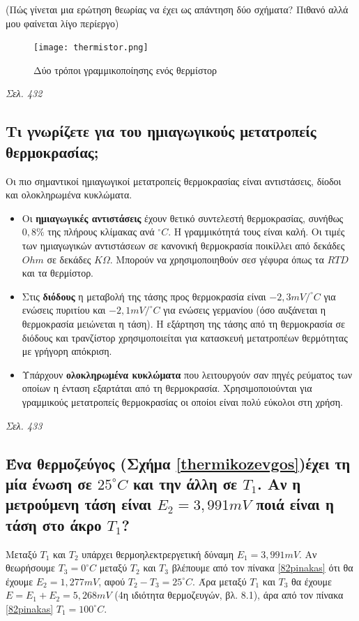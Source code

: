 \documentclass{article}
\begin{document}
(Πώς γίνεται μια ερώτηση θεωρίας να έχει ως απάντηση δύο σχήματα? Πιθανό αλλά μου φαίνεται λίγο περίεργο)

\begin{figure}[h!]
    \texttt{[image: thermistor.png]}
    \caption{Δύο τρόποι γραμμικοποίησης ενός θερμίστορ}
    \label{thermistor}
\end{figure}

\emph{Σελ. 432}

\subsection{Τι γνωρίζετε για του ημιαγωγικούς μετατροπείς θερμοκρασίας;}
Οι πιο σημαντικοί ημιαγωγικοί μετατροπείς θερμοκρασίας είναι αντιστάσεις, δίοδοι και ολοκληρωμένα κυκλώματα.

\begin{itemize}
    \item Οι \textbf{ημιαγωγικές αντιστάσεις} έχουν θετικό συντελεστή θερμοκρασίας, συνήθως $0,8\%$ της πλήρους κλίμακας ανά $^{\circ}C$. Η γραμμικότητά τους είναι καλή.
        Οι τιμές των ημιαγωγικών αντιστάσεων σε κανονική θερμοκρασία ποικίλλει από δεκάδες $Ohm$ σε δεκάδες $K\Omega$. Μπορούν να χρησιμοποιηθούν σεσ γέφυρα όπως τα
        $RTD$ και τα θερμίστορ.
    \item Στις \textbf{διόδους} η μεταβολή της τάσης προς θερμοκρασία είναι $-2,3mV/^{\circ}C$ για ενώσεις πυριτίου και $-2,1mV/^{\circ}C$ για ενώσεις γερμανίου (όσο 
        αυξάνεται η θερμοκρασία μειώνεται η τάση). Η εξάρτηση της τάσης από τη θερμοκρασία σε διόδους και τρανζίστορ χρησιμοποιείται για κατασκευή μετατροπέων θερμότητας
        με γρήγορη απόκριση.
    \item Υπάρχουν \textbf{ολοκληρωμένα κυκλώματα} που λειτουργούν σαν πηγές ρεύματος των οποίων η ένταση εξαρτάται από τη θερμοκρασία. Χρησιμοποιούνται για γραμμικούς
        μετατροπείς θερμοκρασίας οι οποίοι είναι πολύ εύκολοι στη χρήση.
\end{itemize}

\emph{Σελ. 433}

\subsection{Ένα θερμοζεύγος (Σχήμα \ref{thermikozevgos})έχει τη μία ένωση σε $25^{\circ} C$ και την άλλη σε $T_1$. Αν η μετρούμενη τάση είναι $E_2=3,991mV$ 
ποιά είναι η τάση στο άκρο $T_1$?}
Μεταξύ $T_1$ και $T_2$ υπάρχει θερμοηλεκτρεργετική δύναμη $E_1 = 3,991 mV$. Αν θεωρήσουμε $T_3 = 0^{\circ}C$ μεταξύ $T_2$ και $T_3$ βλέπουμε από τον πίνακα 
\ref{82pinakas} ότι θα έχουμε $E_2 = 1,277mV$, αφού $T_2 - T_3 = 25^{\circ}C$. Άρα μεταξύ $T_1$ και $T_3$ θα έχουμε $E = E_1 + E_2 = 5,268mV$ (4η ιδιότητα 
θερμοζευγών, βλ. 8.1), άρα από τον πίνακα \ref{82pinakas} $T_1 = 100^{\circ}C$.
\end{document}
